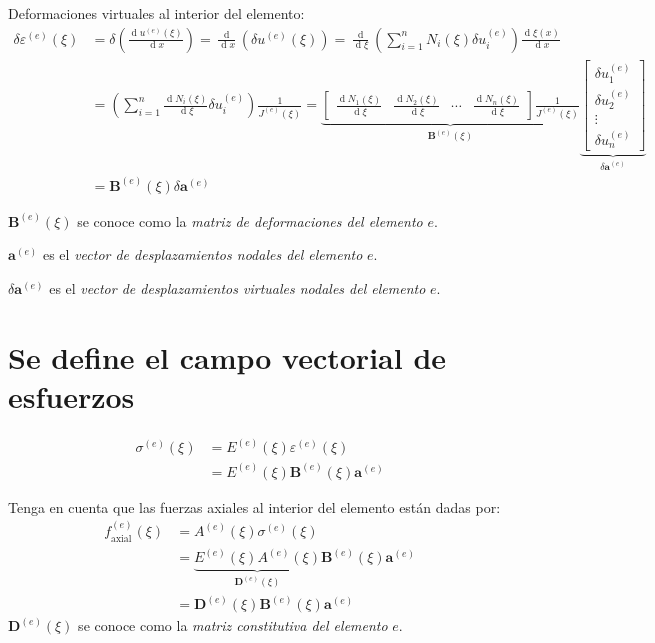 \documentclass[12pt,letterpaper]{article}
\newcommand{\ve}[1]{{\boldsymbol{#1}}}
\newcommand{\ma}[1]{{\boldsymbol{#1}}}
\newcommand{\dd}{\operatorname{d} \!}
\begin{document}
Deformaciones virtuales al interior del elemento:
\begin{align}
\delta \varepsilon^{(e)}(\xi) &= \delta \left(\frac{\dd u^{(e)}(\xi)}{\dd x}\right) = \frac{\dd}{\dd x}\left(\delta u^{(e)}(\xi)\right)
= \frac{\dd}{\dd \xi}\left(\sum_{i=1}^n N_i(\xi) \delta u_i^{(e)}\right)\frac{\dd \xi(x)}{\dd x} \\
&= \left(\sum_{i=1}^n \frac{\dd N_i(\xi)}{\dd \xi} \delta u_i^{(e)}\right)\frac{1}{J^{(e)}(\xi)} = 
\underbrace{\begin{bmatrix}
   \frac{\dd N_1(\xi)}{\dd \xi} & \frac{\dd N_2(\xi)}{\dd \xi} & \cdots & \frac{\dd N_n(\xi)}{\dd \xi}
   \end{bmatrix} \frac{1}{J^{(e)}(\xi)} }_{\ma{B}^{(e)}(\xi)}
\underbrace{\begin{bmatrix}
  \delta u_1^{(e)} \\ \delta u_2^{(e)} \\ \vdots \\ \delta u_n^{(e)} 
   \end{bmatrix}}_{\delta \ma{a}^{(e)}} \\
&= \ma{B}^{(e)}(\xi) \delta \ve{a}^{(e)}
\end{align}

$\ma{B}^{(e)}(\xi)$ se conoce como la \emph{matriz de deformaciones del elemento} $e$.

$\ve{a}^{(e)}$ es el \emph{vector de desplazamientos nodales del elemento} $e$.

$\delta\ve{a}^{(e)}$ es el \emph{vector de desplazamientos virtuales nodales del elemento} $e$.

\newpage
\section{Se define el campo vectorial de esfuerzos}
\begin{align}
\sigma^{(e)}(\xi) 
&= E^{(e)}(\xi) \varepsilon^{(e)}(\xi) \\
&= E^{(e)}(\xi) \ma{B}^{(e)}(\xi) \ve{a}^{(e)}
\end{align}

Tenga en cuenta que las fuerzas axiales al interior del elemento están dadas por:
\begin{align}
f^{(e)}_{\text{axial}}(\xi) 
&= A^{(e)}(\xi) \sigma^{(e)}(\xi) \\
&= \underbrace{E^{(e)}(\xi) A^{(e)}(\xi)}_{\ma{D}^{(e)}(\xi)} \ma{B}^{(e)}(\xi) \ve{a}^{(e)} \\
&= \ma{D}^{(e)}(\xi) \ma{B}^{(e)}(\xi) \ve{a}^{(e)}
\end{align}
$\ma{D}^{(e)}(\xi)$ se conoce como la \emph{matriz constitutiva del elemento} $e$.
\end{document}
